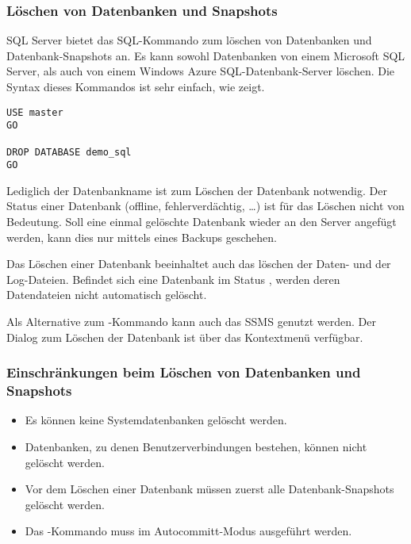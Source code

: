         \subsubsection{Löschen von Datenbanken und Snapshots}
          SQL Server bietet das SQL-Kommando  zum
          löschen von Datenbanken und Datenbank-Snapshots an. Es kann sowohl Datenbanken
          von einem Microsoft SQL Server, als auch von einem Windows Azure SQL-Datenbank-Server löschen.
          Die Syntax dieses Kommandos ist sehr einfach, wie 
          zeigt.
          \begin{lstlisting}[language=ms_sql,caption={Löschen der
            Datenbank demo\_sql},label=admin03_25]
USE master 
GO

DROP DATABASE demo_sql
GO 
          \end{lstlisting}
          Lediglich der Datenbankname ist zum Löschen der Datenbank notwendig. Der
          Status einer Datenbank (offline, fehlerverdächtig, \ldots) ist f\"ur das
          Löschen nicht von Bedeutung. Soll eine einmal gelöschte Datenbank wieder
          an den Server angefügt werden, kann dies nur mittels eines Backups
          geschehen.
          \begin{merke}
            Das Löschen einer Datenbank beeinhaltet auch das löschen der
            Daten- und der Log-Dateien. Befindet sich eine Datenbank im Status
            , werden deren Datendateien nicht automatisch
            gelöscht.
          \end{merke}
          Als Alternative zum -Kommando kann auch
          das SSMS genutzt werden. Der Dialog zum Löschen der Datenbank ist über
          das Kontextmenü verfügbar.
          \subsubsection{Einschränkungen beim Löschen
          von Datenbanken und Snapshots}
          \begin{itemize}
              \item Es können keine Systemdatenbanken gelöscht werden.
              \item Datenbanken, zu denen Benutzerverbindungen bestehen, können
              nicht gelöscht werden.
              \item Vor dem Löschen einer Datenbank müssen zuerst alle
              Datenbank-Snapshots gelöscht werden.
              \item Das -Kommando muss im
              Autocommitt-Modus ausgeführt werden.
          \end{itemize}
